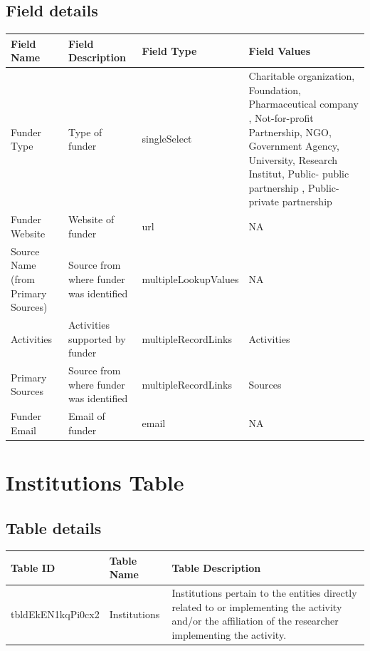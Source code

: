\documentclass[
]{book}
\begin{document}
\hypertarget{field-details-1}{%
\subsection{Field details}\label{field-details-1}}

\begin{table}
\centering
\begin{tabular}{l|l|l|l}
\hline
\textbf{Field Name} & \textbf{Field Description} & \textbf{Field Type} & \textbf{Field Values}\\
\hline
Funder Type & Type of funder & singleSelect & Charitable organization, Foundation, Pharmaceutical company , Not-for-profit Partnership, NGO, Government Agency, University, Research Institut, Public- public partnership , Public-private partnership\\
\hline
Funder Website & Website of funder & url & NA\\
\hline
Source Name (from Primary Sources) & Source from where funder was identified & multipleLookupValues & NA\\
\hline
Activities & Activities supported by funder & multipleRecordLinks & Activities\\
\hline
Primary Sources & Source from where funder was identified & multipleRecordLinks & Sources\\
\hline
Funder Email & Email of funder & email & NA\\
\hline
\end{tabular}
\end{table}

\hypertarget{institutions-table}{%
\section{Institutions Table}\label{institutions-table}}

\hypertarget{table-details-5}{%
\subsection{Table details}\label{table-details-5}}

\begin{table}
\centering
\begin{tabular}{l|l|l}
\hline
\textbf{Table ID} & \textbf{Table Name} & \textbf{Table Description}\\
\hline
tbldEkEN1kqPi0cx2 & Institutions & Institutions pertain to the entities directly related to or implementing the activity and/or the affiliation of the researcher implementing the activity.\\
\hline
\end{tabular}
\end{table}
\end{document}
